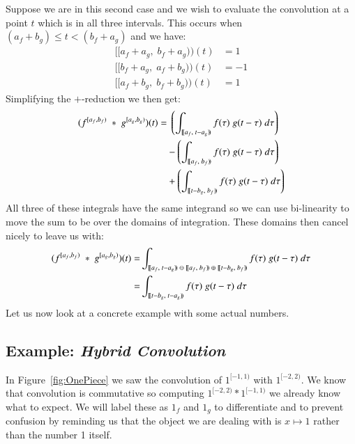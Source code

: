 
Suppose we are in this second case and we wish to evaluate the convolution at a point $t$ which is in all three intervals.
This occurs when $(a_f+b_g) \leq t < (b_f+a_g)$ and we have:
\begin{align*}
	[\![a_f+a_g, \; b_f+a_g)\!)(t) &= 1 \\
	[\![b_f+a_g, \; a_f+b_g)\!)(t) &= -1 \\
	[\![a_f+b_g,\; b_f+b_g)\!)(t) &= 1
\end{align*}
Simplifying the $+$-reduction we then get:
\begin{align}
	(f^{[a_f,b_f)} \;*\; g^{[a_g,b_g)}) (t) = 
		& \; \left( 
			\int_{[\![a_f,\;t-a_g)\!)} f(\tau) \; g(t-\tau) \; d\tau \right) 
				\notag \\ &- \left( 
			\int_{[\![a_f,\;b_f)\!)} f(\tau) \; g(t-\tau) \; d\tau \right)
				\notag \\ &+ \left( 
			\int_{[\![t-b_g,\;b_f)\!)} f(\tau) \; g(t-\tau) \; d\tau \right) 
\end{align}
All three of these integrals have the same integrand so we can use bi-linearity to move the sum to be over the domains
of integration.
These domains then cancel nicely to leave us with:
\begin{align}
	\label{eqn:HybridConvMidFinal}
	(f^{[a_f,b_f)} \;*\; g^{[a_g,b_g)}) (t) = &
		\int_{[\![a_f,\;t-a_g)\!) \;\ominus\; [\![a_f,\;b_f)\!) \;\oplus\; [\![t-b_g,\;b_f)\!)} f(\tau) \; g(t-\tau) \; d\tau \notag\\
		= & \int_{[\![t-b_g,\;t-a_g)\!)} f(\tau) \; g(t-\tau) \; d\tau
\end{align}
Let us now look at a concrete example with some actual numbers.



\subsection{Example: \emph{Hybrid Convolution}}


In Figure~\ref{fig:OnePiece} we saw the convolution of $1^{[-1,1)}$ with $1^{[-2,2)}$.
We know that convolution is commutative so computing $1^{[-2,2)} * 1^{[-1,1)}$ we already know what to expect.
We will label these as $1_f$ and $1_g$ to differentiate and to prevent confusion by reminding us that the object we are 
dealing with is $x \mapsto 1$ rather than the number 1 itself.


